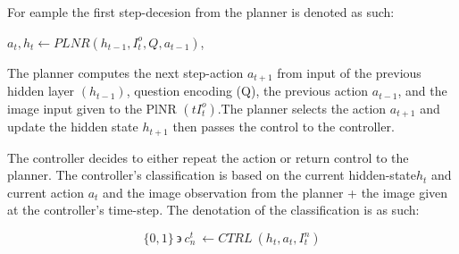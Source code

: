 For eample the first  step-decesion from the planner is denoted as such: 
\vspace{0.3cm}

\hspace{1cm}        \begin{math} a_{t} ,h_{t}{}\leftarrow PLNR\left( h_{t-1} ,I_{t}^{o} ,Q,a_{t-1}\right) \end{math},
        
\vspace{0.3cm}

The planner computes the next step-action  \begin{math} a_{t+1} \end{math} from input of the previous hidden layer \begin{math} (h_{t-1}) \end{math}, question encoding (Q), the previous action  \begin{math} a_{t-1} \end{math}, and the image input given to the PlNR \begin{math} (tI_{t}^{o}) \end{math}.The planner selects the action \begin{math} a_{t+1}\end{math} and update the hidden state \begin{math} h_{t+1} \end{math} then passes the control to the controller. 

\vspace{0.3cm}


The controller decides to either repeat the action or return control to the planner. The controller's classification is based on the current hidden-state\begin{math} h_{t}  \end{math} and current action \begin{math} a_{t} \end{math} and the image observation from the planner + the image given at the controller's time-step. The denotation of the classification is as such: 

\vspace{0.3cm}

\[ \{0,1\} \ \backepsilon \ c_{n}^{t} \ \leftarrow CTRL\ \left( h_{t} ,a_{t} ,I_{t}^{n}\right)  \]


